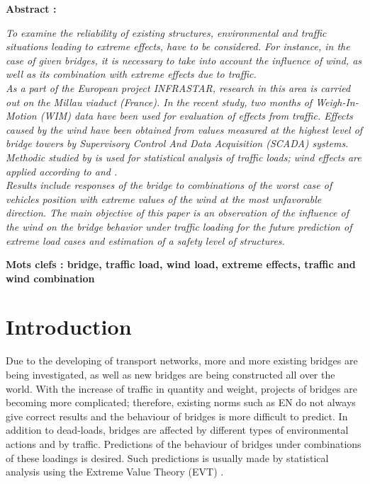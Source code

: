 \documentclass[11pt,a4paper]{article}
\begin{document}
\vspace{20pt}

{\fontsize{16}{20}
\bf
Abstract :
}
\bigskip

\textit{%
To examine the reliability of existing structures, environmental and traffic situations leading to extreme effects, have to be considered. For instance, in the case of given bridges, it is necessary to take into account the influence of wind, as well as its combination with extreme effects due to traffic.\\
As a part of the European project INFRASTAR, research in this area is carried out on the Millau viaduct (France). In the recent study, two months of Weigh-In-Motion (WIM) data have been used for evaluation of effects from traffic. Effects caused by the wind have been obtained from values measured at the highest level of bridge towers by Supervisory Control And Data Acquisition (SCADA) systems. Methodic studied by \cite{Zhou2013} is used for statistical analysis of traffic loads; wind effects are applied according to \cite{Zhang2014} and \cite{Arena2014}. \\
Results include responses of the bridge to combinations of the worst case of vehicles position with extreme values of the wind at the most unfavorable direction. The main objective of this paper is an observation of the influence of the wind on the bridge behavior under traffic loading for the future prediction of extreme load cases and estimation of a safety level of structures.}

\vspace{28pt}

{\fontsize{14}{20}
\bf
Mots clefs : bridge, traffic load, wind load, extreme effects, traffic and wind combination
}
\bigskip

\section{Introduction}
\medskip
Due to the developing of transport networks, more and more existing bridges are being investigated, as well as new bridges are being constructed all over the world. With the increase of traffic in quantity and weight, projects of bridges are becoming more complicated; therefore, existing norms such as EN \cite{ENwind,ENbridge} do not always give correct results \cite{Moham2013} and the behaviour of bridges is more difficult to predict. In addition to dead-loads, bridges are affected by different types of environmental actions and by traffic. Predictions of the behaviour of bridges under combinations of these loadings is desired. Such predictions is usually made by statistical analysis using the Extreme Value Theory (EVT) \cite{Coles2001}.
\end{document}
